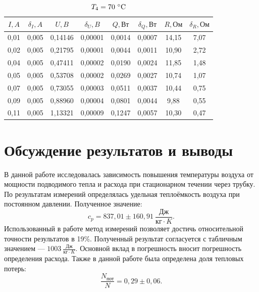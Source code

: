\documentclass[a4paper, 12pt]{article}
\begin{document}
\newpage

\begin{table}[h!]
\begin{center}
\begin{tabular}{|c|c|c|c|c|c|c|c|}
\hline
$I, A$ & $\delta_I, A$ & $U, B$  & $\delta_U, B$ & $Q, Вт$ & $\delta_Q, Вт$ & $R, Ом$ & $\delta_R, Ом$ \\ \hline
0,01   & 0,005         & 0,14146 & 0,00001       & 0,0014  & 0,0007         & 14,15   & 7,07           \\ \hline
0,02   & 0,005         & 0,21795 & 0,00001       & 0,0044  & 0,0011         & 10,90   & 2,72           \\ \hline
0,04   & 0,005         & 0,47411 & 0,00002       & 0,0190  & 0,0024         & 11,85   & 1,48           \\ \hline
0,05   & 0,005         & 0,53708 & 0,00002       & 0,0269  & 0,0027         & 10,74   & 1,07           \\ \hline
0,07   & 0,005         & 0,73055 & 0,00003       & 0,0511  & 0,0037         & 10,44   & 0,75           \\ \hline
0,09   & 0,005         & 0,88960 & 0,00004       & 0,0801  & 0,0044         & 9,88    & 0,55           \\ \hline
0,11   & 0,005         & 1,13321 & 0,00009       & 0,1247  & 0,0057         & 10,30   & 0,47           \\ \hline
\end{tabular}
\caption{$T_4 = 70~\celsius$}
\label{tab4}
\end{center}
\end{table}



\section{Обсуждение результатов и выводы}

В данной работе исследовалась зависимость повышения температуры воздуха от мощности подводимого тепла и расхода при стационарном течении через трубку. По результатам измерений определялась удельная теплоёмкость воздуха при постоянном давлении. Полученное значение:
$$\boxed{c_p = 837,01\pm160,91~\frac{Дж}{кг \cdot K}}.$$
Использованный в работе метод измерений позволяет достичь относительной точности результатов в 19\%. Полученный результат согласуется с табличным значением --- $1003~\frac{Дж}{кг \cdot K}$. Основной вклад в погрешность вносит погрешность определения расхода.
Также в данной работе была определена доля тепловых потерь:
$$\boxed{\frac{N_{пот}}{N} = 0,29\pm0,06}.$$
\end{document}
